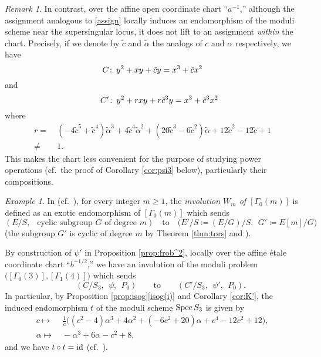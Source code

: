\documentclass{gtpart}
\theoremstyle{definition}
\theoremstyle{remark}
\newtheorem{rmk}[thm]{Remark}
\newtheorem{ex}[thm]{Example}
\def\co{\colon\thinspace}
\newcommand{\Spec}{{\rm Spec\thinspace}}
\newcommand{\TA}{\tilde{\A}}
\newcommand{\Tc}{\tilde{c}}
\newcommand{\id}{{\rm id}}
\newcommand{\A}{\alpha}
\newcommand{\G}{\Gamma}
\newcommand{\ce}{\coloneqq}
\newcommand{\isog}[1]{Proposition \ref{prop:isog}\thinspace \eqref{isog(#1)}}
\numberwithin{equation}{section}
\numberwithin{thm}{section}
\begin{document}
\begin{rmk}
 In contrast, over the affine open coordinate chart ``$a^{-1}$,'' 
 although the assignment analogous to \eqref{assign} locally induces an 
 endomorphism of the moduli scheme near the supersingular locus, it does 
 not lift to an assignment {\em within} the chart.  Precisely, if we 
 denote by $\Tc$ and $\TA$ the analogs of $c$ and $\A$ respectively, we 
 have 
 \[
  C \co y^2 + x y + \Tc y = x^3 + \Tc x^2 
 \]
 and 
 \[
  \quad ~~ C' \co y^2 + r x y + r \Tc^3 y = x^3 + \Tc^3 x^2 
 \]
 where 
 \begin{equation*}
 \begin{split}
   r = & ~ (-4 \Tc^5 + \Tc^4) \TA^3 + 4 \Tc^4 \TA^2 + (20 \Tc^3 - 6 \Tc^2) \TA + 12 \Tc^2 - 12 \Tc + 1 \\
  \neq & ~ 1.  
 \end{split}
 \end{equation*}
 This makes the chart less convenient for the purpose of studying power 
 operations (cf.~the proof of Corollary \ref{cor:psi3} below), 
 particularly their compositions.  
\end{rmk}

\begin{ex}
\label{ex:ab3}
 In \cite[11.3.1]{KM} (cf.~\cite[Lemmas 7-10]{atkinlehner}), for every 
 integer $m \geq 1$, the {\em involution $W_m$ of $[\G_0(m)]$} is 
 defined as an exotic endomorphism of $[\G_0(m)]$ which sends 
 \[
  (E/S, ~~ \text{~cyclic subgroup~} G \text{~of degree~} m) \quad 
  \text{to} \quad \big( E'/S \ce (E/G)/S, ~~ G' \ce E[m]/G \big) 
 \]
 (the subgroup $G'$ is cyclic of degree $m$ by Theorem \ref{thm:tors} 
 and \cite[12.2.5]{KM}).  

 By construction of $\psi'$ in Proposition \ref{prop:frob^2}, locally 
 over the affine \'etale coordinate chart ``$b^{-1/2}$,'' we have an 
 involution of the moduli problem $\big( [\G_0(3)], [\G_1(4)] \big)$ 
 which sends 
 \[
  \qquad (C/S_3, ~~ \psi, ~~ P_0) \qquad \text{to} \qquad 
  (C'/S_3, ~~ \psi', ~~ P_0).  
 \]
 In particular, by \isog{i} and Corollary \ref{cor:K'}, the induced 
 endomorphism $t$ of the moduli scheme $\Spec S_3$ is given by 
 \begin{equation*}
 \begin{split}
   c \longmapsto & ~ \frac{1}{c} \big( (c^2 - 4) \A^3 + 4 \A^2 + (-6 c^2 + 20) \A + c^4 - 12 c^2 + 12 \big), \\
  \A \longmapsto & ~ -\A^3 + 6 \A - c^2 + 8, 
 \end{split}
 \end{equation*}
 and we have $t \circ t = \id$ (cf.~\cite[Section 5]{tmf3}).  
\end{ex}
\end{document}
